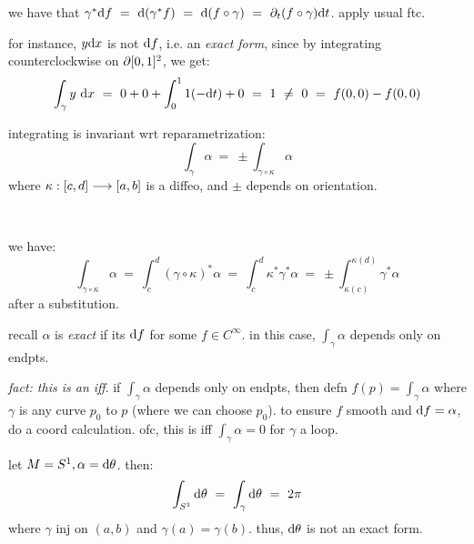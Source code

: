 \begin{pf}
	we have that
	$\gamma^{*}\d f \ = \ \d(\gamma^{*}f) \ = \ \d(f\circ\gamma) \ = \ \p_{t}(f\circ\gamma)\d t$.
	apply usual ftc.
\end{pf}

for instance, $y\textrm{d} x$ is not $\textrm{d} f$, i.e. an \textit{exact form}, since
by integrating counterclockwise on $\partial[0,1]^{2}$, we get:
\begin{equation*}
	\int_{\gamma}y\textrm{ d} x \ = \ 0+0+\int_{0}^{1}1(-\textrm{d} t) + 0 \ = \ 1 \ \neq \ 0 \ = \ f(0,0)-f(0,0)
\end{equation*}

\begin{prop}
	integrating is invariant wrt reparametrization:
	\begin{equation*}
		\int_{\gamma}\alpha \ = \ \pm\int_{\gamma\circ\kappa}\alpha
	\end{equation*}
	where $\kappa:[c,d]\longrightarrow[a,b]$ is a diffeo, and $\pm$ depends on orientation.
\end{prop} \

\begin{pf}
	we have:
	\begin{equation*}
		\int_{\gamma\circ\kappa}\alpha \ = \ \int_{c}^{d}(\gamma\circ\kappa)^{*}\alpha
		\ = \ \int_{c}^{d}\kappa^{*}\gamma^{*}\alpha \ = \ \pm \int_{\kappa(c)}^{\kappa(d)}\gamma^{*}\alpha
	\end{equation*}
	after a substitution.
\end{pf}

recall $\alpha$ is \textit{exact} if its $\textrm{d} f$ for some $f\in C^{\infty}$.
in this case, $\int_{\gamma}\alpha$ depends only on endpts.

\textit{fact: this is an iff}.
if $\int_{\gamma}\alpha$ depends only on endpts, then defn $f(p)=\int_{\gamma}\alpha$ where
$\gamma$ is any curve $p_{0}$ to $p$ (where we can choose $p_{0}$).
to ensure $f$ smooth and $\textrm{d} f=\alpha$, do a coord calculation.
ofc, this is iff $\int_{\gamma}\alpha=0$ for $\gamma$ a loop.

\begin{xmp}
	let $M=S^{1},\alpha=\textrm{d}\theta$. then:
	\begin{equation*}
		\int_{S^{1}}\d\theta \ = \ \int_{\gamma}\d\theta \ = \ 2\pi
	\end{equation*}
	where $\gamma$ inj on $(a,b)$ and $\gamma(a)=\gamma(b)$.
	thus, $\textrm{d}\theta$ is not an exact form.
\end{xmp}

